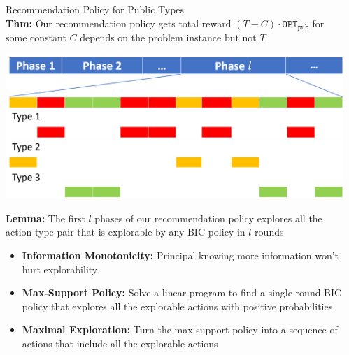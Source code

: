 \documentclass[final]{beamer}
\newlength{\onecolwid}
\newlength{\twocolwid}
\newcommand{\term}[1]{\ensuremath{\mathtt{#1}}}
\def\OPT{\term{OPT}}
\newcommand{\OPTpub}{\OPT_{\term{pub}}}
\begin{document}
\begin{frame}[t]
\begin{columns}[t]
\begin{columns}[t,totalwidth=\twocolwid]
\begin{column}{\onecolwid}
\end{column} %

\begin{column}{\onecolwid} %


\begin{block}{Recommendation Policy for Public Types}
~\\
\textbf{Thm:} Our recommendation policy gets total reward $(T- C)\cdot \OPTpub$ for some constant $C$ depends on the problem instance but not $T$\\
\begin{center}
\includegraphics[width=0.99\linewidth]{recommendation.png} 
\end{center}

\textbf{Lemma:} The first $l$ phases of our recommendation policy explores all the action-type pair that is explorable by any BIC policy in $l$ rounds\\

\begin{itemize}
\item \textbf{Information Monotonicity:} Principal knowing more information won't hurt explorability \\

\item \textbf{Max-Support Policy:} Solve a linear program to find a single-round BIC policy that explores all the explorable actions with positive probabilities\\

\item \textbf{Maximal Exploration:} Turn the max-support policy into a sequence of actions that include all the explorable actions 
\end{itemize}
\end{block}


\end{column}
\end{columns}
\end{columns}
\end{frame}
\end{document}
